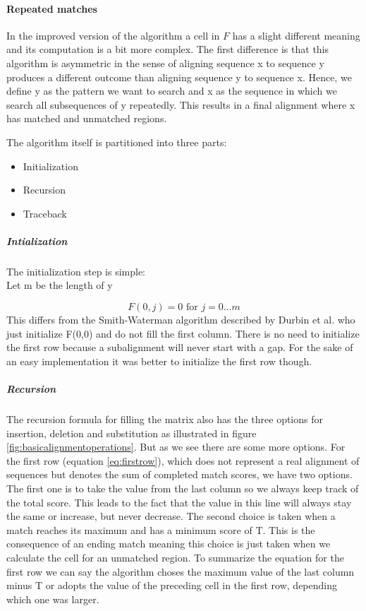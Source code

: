 \paragraph{Repeated matches}
In the improved version of the algorithm a cell in $F$ has a slight different meaning and its computation is a bit more complex.
The first difference is that this algorithm is asymmetric in the sense of aligning sequence x to sequence y produces a different outcome than aligning sequence y to sequence x.
Hence, we define y as the pattern we want to search and x as the sequence in which we search all subsequences of y repeatedly.
This results in a final alignment where x has matched and unmatched regions.

The algorithm itself is partitioned into three parts:

\begin{itemize}
	\item Initialization
	\item Recursion
	\item Traceback
\end{itemize}

\subparagraph{Intialization}
	The initialization step is simple: \\
	Let m be the length of y

	\begin{equation*}
		F(0,j) = 0 \text{ for } j=0\dotsc m
	\end{equation*}
	This differs from the Smith-Waterman algorithm described by Durbin et al.\cite{durbin1998} who just initialize F(0,0) and do not fill the first column. There is no need to initialize the first row because a subalignment will never start with a gap. For the sake of an easy implementation it was better to initialize the first row though.

\subparagraph{Recursion}
The recursion formula for filling the matrix also has the three options for insertion, deletion and substitution as illustrated in figure \ref{fig:basicalignmentoperations}.
But as we see there are some more options.
For the first row (equation \ref{eq:firstrow}), which does not represent a real alignment of sequences but denotes the sum of completed match scores, we have two options.
The first one is to take the value from the last column so we always keep track of the total score.
This leads to the fact that the value in this line will always stay the same or increase, but never decrease.
The second choice is taken when a match reaches its maximum and has a minimum score of T.
This is the consequence of an ending match meaning this choice is just taken when we calculate the cell for an unmatched region.
To summarize the equation for the first row we can say the algorithm choses the maximum value of the last column minus T or adopts the value of the preceding cell in the first row, depending which one was larger.

